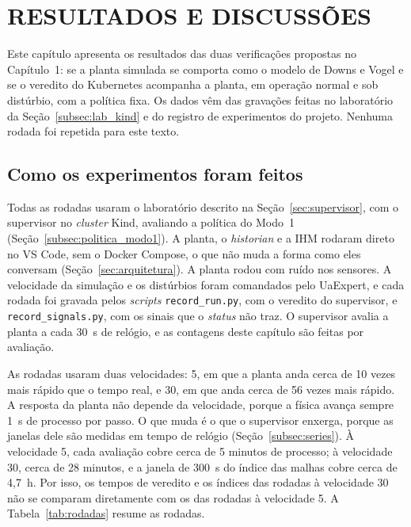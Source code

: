 \chapter{RESULTADOS E DISCUSSÕES}
\label{cha:resultados}

\providecommand{\cabecalho}[1]{\begin{tabular}[c]{@{}c@{}}#1\end{tabular}}

Este capítulo apresenta os resultados das duas verificações propostas no Capítulo~1: se a planta simulada se comporta como o modelo de Downs e Vogel e se o veredito do Kubernetes acompanha a planta, em operação normal e sob distúrbio, com a política fixa. Os dados vêm das gravações feitas no laboratório da Seção~\ref{subsec:lab_kind} e do registro de experimentos do projeto. Nenhuma rodada foi repetida para este texto.

\section{Como os experimentos foram feitos}
\label{sec:metodo_exp}

Todas as rodadas usaram o laboratório descrito na Seção~\ref{sec:supervisor}, com o supervisor no \textit{cluster} Kind, avaliando a política do Modo~1 (Seção~\ref{subsec:politica_modo1}). A planta, o \textit{historian} e a IHM rodaram direto no VS Code, sem o Docker Compose, o que não muda a forma como eles conversam (Seção~\ref{sec:arquitetura}). A planta rodou com ruído nos sensores. A velocidade da simulação e os distúrbios foram comandados pelo UaExpert, e cada rodada foi gravada pelos \textit{scripts} \texttt{record\_run.py}, com o veredito do supervisor, e \texttt{record\_signals.py}, com os sinais que o \textit{status} não traz. O supervisor avalia a planta a cada 30~s de relógio, e as contagens deste capítulo são feitas por avaliação.

As rodadas usaram duas velocidades: 5, em que a planta anda cerca de 10 vezes mais rápido que o tempo real, e 30, em que anda cerca de 56 vezes mais rápido. A resposta da planta não depende da velocidade, porque a física avança sempre 1~s de processo por passo. O que muda é o que o supervisor enxerga, porque as janelas dele são medidas em tempo de relógio (Seção~\ref{subsec:series}). À velocidade 5, cada avaliação cobre cerca de 5 minutos de processo; à velocidade 30, cerca de 28 minutos, e a janela de 300~s do índice das malhas cobre cerca de 4,7~h. Por isso, os tempos de veredito e os índices das rodadas à velocidade 30 não se comparam diretamente com os das rodadas à velocidade 5. A Tabela~\ref{tab:rodadas} resume as rodadas.

